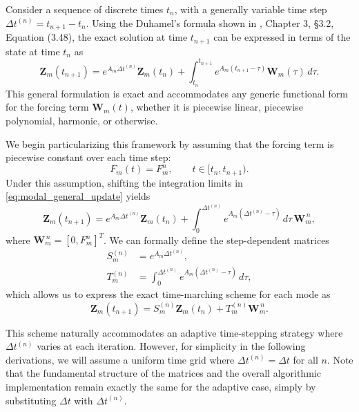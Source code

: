\documentclass{Configuration_Files/PoliMi3i_thesis}
\begin{document}
Consider a sequence of discrete times $t_n$, with a generally variable time step $\Delta t^{(n)} = t_{n+1} - t_n$. Using the Duhamel's formula shown in \cite{teschl_ordinary_2012}, Chapter 3, \S3.2, Equation (3.48), the exact solution at time $t_{n+1}$ can be expressed in terms of the state at time $t_n$ as
\begin{equation} \label{eq:modal_general_update}
\mathbf Z_m(t_{n+1})
=
e^{A_m\Delta t^{(n)}}
\mathbf Z_m(t_n)
+
\int_{t_n}^{t_{n+1}}
e^{A_m(t_{n+1}-\tau)}
\mathbf W_m(\tau)
\,d\tau.
\end{equation}
This general formulation is exact and accommodates any generic functional form for the forcing term $\mathbf W_m(t)$, whether it is piecewise linear, piecewise polynomial, harmonic, or otherwise.

We begin particularizing this framework by assuming that the forcing term is piecewise constant over each time step:
\begin{equation*}
F_m(t)=F_m^n,
\qquad
t\in[t_n,t_{n+1}).
\end{equation*}
Under this assumption, shifting the integration limits in \eqref{eq:modal_general_update} yields
\begin{equation*}
\mathbf Z_m(t_{n+1})
=
e^{A_m\Delta t^{(n)}}
\mathbf Z_m(t_n)
+
\int_0^{\Delta t^{(n)}}
e^{A_m(\Delta t^{(n)}-\tau)}
\,d\tau\,
\mathbf W_m^{\,n},
\end{equation*}
where $\mathbf W_m^{\,n} = [0, F_m^n]^T$. We can formally define the step-dependent matrices
\begin{align*}
S_m^{(n)}
&=
e^{A_m\Delta t^{(n)}}, 
\\
T_m^{(n)}
&=
\int_0^{\Delta t^{(n)}}
e^{A_m(\Delta t^{(n)}-\tau)}
\,d\tau, 
\end{align*}
which allows us to express the exact time-marching scheme for each mode as
\begin{equation} \label{eq:modal_update_variable}
\mathbf Z_m(t_{n+1})
=
S_m^{(n)}
\mathbf Z_m(t_n)
+
T_m^{(n)}
\mathbf W_m^{\,n}.
\end{equation}

This scheme naturally accommodates an adaptive time-stepping strategy where $\Delta t^{(n)}$ varies at each iteration. However, for simplicity in the following derivations, we will assume a uniform time grid where $\Delta t^{(n)} = \Delta t$ for all $n$. Note that the fundamental structure of the matrices and the overall algorithmic implementation remain exactly the same for the adaptive case, simply by substituting $\Delta t$ with $\Delta t^{(n)}$.
\end{document}
